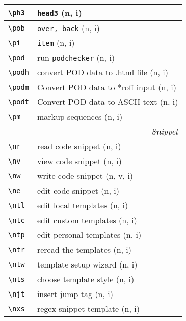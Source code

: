 \documentclass[oneside,10pt,landscape,DIV17]{scrartcl}
\begin{document}
\begin{multicols}{3}
\begin{center}
\begin{tabular}[]{|p{11mm}|p{60mm}|}
\hline \verb'\ph3'    & \verb'head3'                    \hfill (n, i)\\
\hline \verb'\pob'    & \verb'over, back'               \hfill (n, i)\\
\hline \verb'\pi'     & \verb'item'                     \hfill (n, i)\\
\hline \verb'\pod'    & run \verb'podchecker'           \hfill (n, i)\\
\hline \verb'\podh'   & convert POD data to .html file  \hfill (n, i)\\
\hline \verb'\podm'   & Convert POD data to *roff input \hfill (n, i)\\
\hline \verb'\podt'   & Convert POD data to ASCII text  \hfill (n, i)\\
\hline \verb'\pm'     & markup sequences                \hfill (n, i)\\
\hline
\hline
\multicolumn{2}{|r|}{\textsl{S\textbf{n}ippet}}                \\[1.0ex]
\hline \verb'\nr'  & read code snippet         \hfill (n, i)   \\
\hline \verb'\nv'  & view code snippet         \hfill (n, i)   \\
\hline \verb'\nw'  & write code snippet        \hfill (n, v, i)\\
\hline \verb'\ne'  & edit code snippet         \hfill (n, i)   \\
%
\hline \verb'\ntl' & edit local templates      \hfill (n, i)\\
\hline \verb'\ntc' & edit custom templates     \hfill (n, i)\\
\hline \verb'\ntp' & edit personal templates   \hfill (n, i)\\
\hline \verb'\ntr' & reread the templates      \hfill (n, i)\\
\hline \verb'\ntw' & template setup wizard     \hfill (n, i)\\
\hline \verb'\nts' & choose template style     \hfill (n, i)\\
%
\hline \verb'\njt' & insert jump tag           \hfill (n, i)\\
\hline \verb'\nxs' & regex snippet template    \hfill (n, i)\\
\hline
\end{tabular}\\
%
%
\end{center}%
\end{multicols}%
\end{document}
